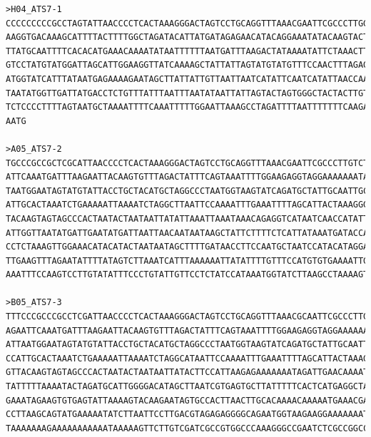 \begin{verbatim}
>H04_ATS7-1
CCCCCCCCCGCCTAGTATTAACCCCTCACTAAAGGGACTAGTCCTGCAGGTTTAAACGAATTCGCCCTTGGCCACGCGTCGACTAGTACTTTTTTTTTTTTTTTTTTTTTTTTTTATTTT
AAGGTGACAAAGCATTTTACTTTTGGCTAGATACATTATGATAGAGAACATACAGGAAATATACAAGTACTTGAAATTTACCATGTTACATTAGAAATTATGGACATAGACATTTAAGCT
TTATGCAATTTTCACACATGAAACAAAATATAATTTTTTAATGATTTAAGACTATAAAATATTCTAAACTTCAACTGTAAAAAAAGTAGATTTGACACATGAGGTATGATTTAGTGACCA
GTCCTATGTATGGATTAGCATTGGAAGGTTATCAAAAGCTATTATTAGTATGTATGTTTCCAACTTTAGAGGCCTTTTACATGTCCTTAATGAATTTATATGCCCTGCATTTGGCATTCA
ATGGTATCATTTATAATGAGAAAAGAATAGCTTATTATTGTTAATTAATCATATTCAATCATATTAACCAATTTAATTAACTTAATATTAATAAACGCACATTAATCAAATTAGTCAACT
TAATATGGTTGATTATGACCTCTGTTTATTTAATTTAATATAATTATTAGTACTAGTGGGCTACTACTTGTAACTTTGGTGCAAAAAAGCTGGTCAGTTTTCAAACATTTTCTCTGCTTG
TCTCCCCTTTTAGTAATGCTAAAATTTTCAAATTTTTGGAATTAAAGCCTAGATTTTAATTTTTTTCAAGATTTAGTGCAAATGGGAGTTTCTCTTTGCCCAAGTCATATACCTCCTGCA
AATG

>A05_ATS7-2
TGCCCGCCGCTCGCATTAACCCCTCACTAAAGGGACTAGTCCTGCAGGTTTAAACGAATTCGCCCTTGTCTCTTTCTGTGTCTCAGCTTCCTCATCCTTAGGATGCCAGTATATTTCAGA
ATTCAAATGATTTAAGAATTACAAGTGTTTAGACTATTTCAGTAAATTTTGGAAGAGGTAGGAAAAAAATAGGAGGTGAAGATGAGCAAAATGCATTGTATCATATATGAAATCCTCAAT
TAATGGAATAGTATGTATTACCTGCTACATGCTAGGCCCTAATGGTAAGTATCAGATGCTATTGCAATTGCTATAATTTCTATCATTTGCATGAGTATATGACTTGGTCAAGAGAACTCC
ATTGCACTAAATCTGAAAAATTAAAATCTAGGCTTAATTCCAAAATTTGAAATTTTAGCATTACTAAAGGGGAGACAGCAGAGAAAATGTTTGAAACTGACCAGCTTTTTTGCACCAAGT
TACAAGTAGTAGCCCACTAATACTAATAATTATATTAAATTAAATAAACAGAGGTCATAATCAACCATATTAAGTTGACTAATTTGATTAATGTGCGTTTATTAATATTAAGTTAATTAA
ATTGGTTAATATGATTGAATATGATTAATTAACAATAATAAGCTATTCTTTTCTCATTATAAATGATACCATTGAATGCCAAATGCAGGGCATATAAATTCATTAAGGACATGTAAAAGG
CCTCTAAAGTTGGAAACATACATACTAATAATAGCTTTTGATAACCTTCCAATGCTAATCCATACATAGGACTGGTCACTAAATCATACCTCATGTGTCAAATCTACTTTTTTTTACAGT
TTGAAGTTTAGAATATTTTATAGTCTTAAATCATTTAAAAAATTATATTTTGTTTCCATGTGTGAAAATTGCATAAAACTTAAATGTCCTATGTCCATAATTTCTAAATGTAACATGGTT
AAATTTCCAAGTCCTTGTATATTTCCCTGTATTGTTCCTCTATCCATAAATGGTATCTTAAGCCTAAAAGTAAAAATGCCTTCGTCCACCTTTTCAA

>B05_ATS7-3
TTTCCCGCCCGCCTCGATTAACCCCTCACTAAAGGGACTAGTCCTGCAGGTTTAAACGCAATTCGCCCTTGTCTCTTTCTGTGTCTCAGCTTCCTCATCCTTAGGATGCCAGTATATTTC
AGAATTCAAATGATTTAAGAATTACAAGTGTTTAGACTATTTCAGTAAATTTTGGAAGAGGTAGGAAAAAATAGGAGGCGAAGATGAGCAAAATGCATTGTATCATATATGAAATCCTCA
ATTAATGGAATAGTATGTATTACCTGCTACATGCTAGGCCCTAATGGTAAGTATCAGATGCTATTGCAATTGCTATAATTTCTATCATTTGCATGAGTATATGACTTGGTCAAGAGAACT
CCATTGCACTAAATCTGAAAAATTAAAATCTAGGCATAATTCCAAAATTTGAAATTTTAGCATTACTAAAGGGGAGACAGCAGAGAAAATGTTTGAAACTGACCAGCTTTTTTGCACCAA
GTTACAAGTAGTAGCCCACTAATACTAATAATTATACTTCCATTAAGAGAAAAAAATAGATTGAACAAAATCAATCATGAGGCAAAGTAGGAAATTTGAAGAATTTTCAAAATATAGAAC
TATTTTTAAAATACTAGATGCATTGGGGACATAGCTTAATCGTGAGTGCTTATTTTTCACTCATGAGGCTATCCTCAGTACCAGGTATCAGAGTATAAAACTTTTAATTTCATTACTGGG
GAAATAGAAGTGTGAGTATTAAAAGTACAAGAATAGTGCCACTTAACTTGCACAAAACAAAAATGAAACGAAACCCCCCACAAGAGCTGAGTAAAGACCTATTACTGGTAAGTTTACGTC
CCTTAAGCAGTATGAAAAATATCTTAATTCCTTGACGTAGAGAGGGGCAGAATGGTAAGAAGGAAAAAAATGTTATTTTTTCAGGATAACTATTTGCAAAATTTTTACCCTGGCTTTCTT
TAAAAAAAGAAAAAAAAAAATAAAAAGTTCTTGTCGATCGCCGTGGCCCAAAGGGCCGAATCTCGCCGGCCCGCCTAAAATTCAACTTCCGCCCCTACTAGTGAGGGTTCGTATTAC


\end{verbatim}
